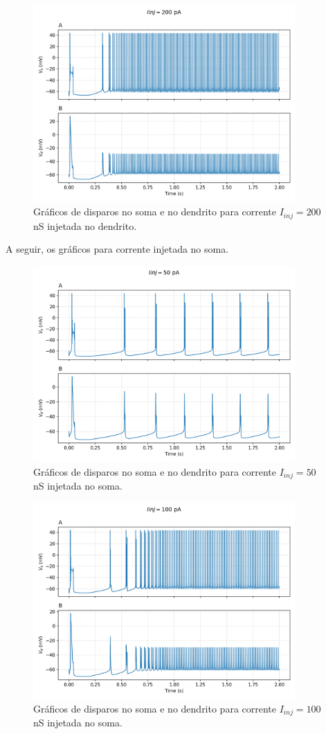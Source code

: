 \documentclass[english,11pt,a4paper]{article}
\begin{document}
	\begin{figure}[H]
		\centering
		\includegraphics[width=10cm]{../figures/ex_5_I200_dend.png}
		\caption{Gráficos de disparos no soma e no dendrito para corrente $I_{inj} = 200$ nS injetada no dendrito.}
	\end{figure}
	
	A seguir, os gráficos para corrente injetada no soma.
	
	\begin{figure}[H]
		\centering
		\includegraphics[width=10cm]{../figures/ex_5_I50_soma.png}
		\caption{Gráficos de disparos no soma e no dendrito para corrente $I_{inj} = 50$ nS injetada no soma.}
	\end{figure}
	
	\begin{figure}[H]
		\centering
		\includegraphics[width=10cm]{../figures/ex_5_I100_soma.png}
		\caption{Gráficos de disparos no soma e no dendrito para corrente $I_{inj} = 100$ nS injetada no soma.}
	\end{figure}
	
\end{document}
